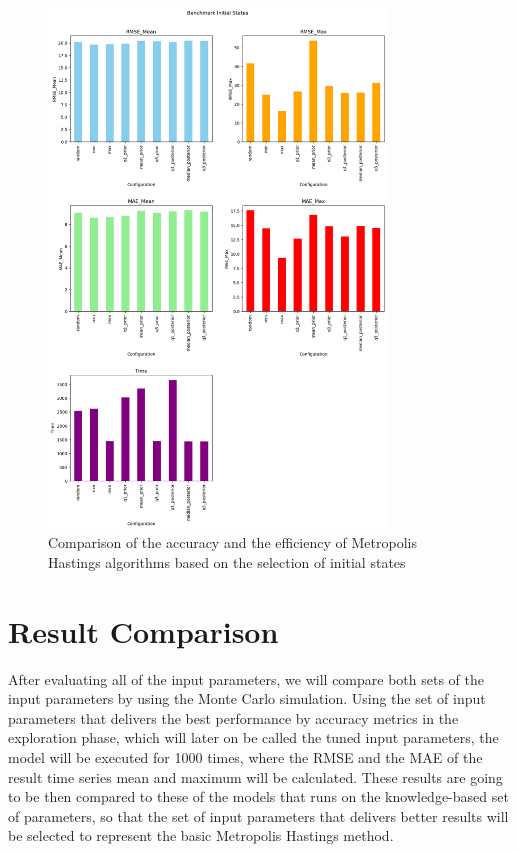 \begin{figure}
    \centering
    \includegraphics[width=0.8\textwidth]{figures/basic_mh/benchmark/init_method.png}
    \captionsetup{width=.8\textwidth}
    \caption{Comparison of the accuracy and the efficiency of Metropolis Hastings algorithms based on the selection of initial states}
    \label{fig:enter-label}
\end{figure}


\section{Result Comparison}
After evaluating all of the input parameters, we will compare both sets of the input parameters by using the Monte Carlo simulation. Using the set of input parameters that delivers the best performance by accuracy metrics in the exploration phase, which will later on be called the tuned input parameters, the model will be executed for 1000 times, where the RMSE and the MAE of the result time series mean and maximum will be calculated. These results are going to be then compared to these of the models that runs on the knowledge-based set of parameters, so that the set of input parameters that delivers better results will be selected to represent the basic Metropolis Hastings method.

